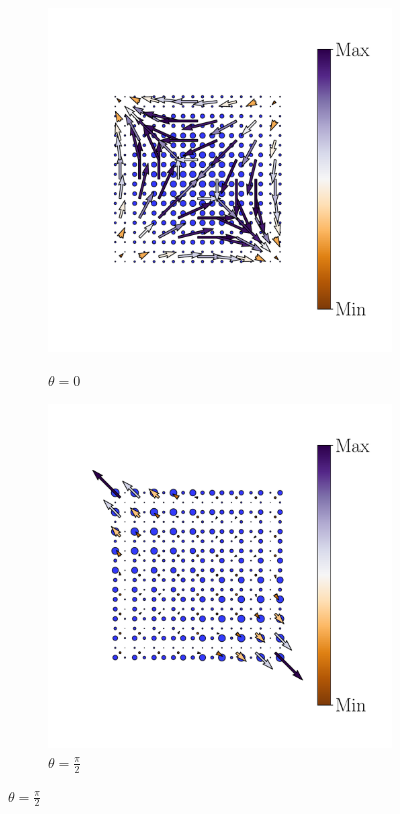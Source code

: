 \begin{figure}[h!]
\begin{minipage}[h!]{1.1\textwidth}
\begin{subfigure}[b!]{0.2 \textwidth}
             \label{}
         \end{subfigure}\hspace*{-0.5em}
          \begin{subfigure}[b!]{0.2 \textwidth}
             \caption*{$\theta = 0$}
             \includegraphics[width=\textwidth]{Imagenes/Resultados_pump_Cuadrado/xy/hoti_pomp_xy_neg3.pdf}
             \label{}
         \end{subfigure}\hspace*{-0.5em}
          \begin{subfigure}[b!]{0.2 \textwidth}
             \caption*{$\theta = \frac{\pi}{2}$}
             \includegraphics[width=\textwidth]{Imagenes/Resultados_pump_Cuadrado/xy/hoti_pomp_xy_neg4.pdf}

\end{subfigure}
\end{minipage}
\end{figure}

